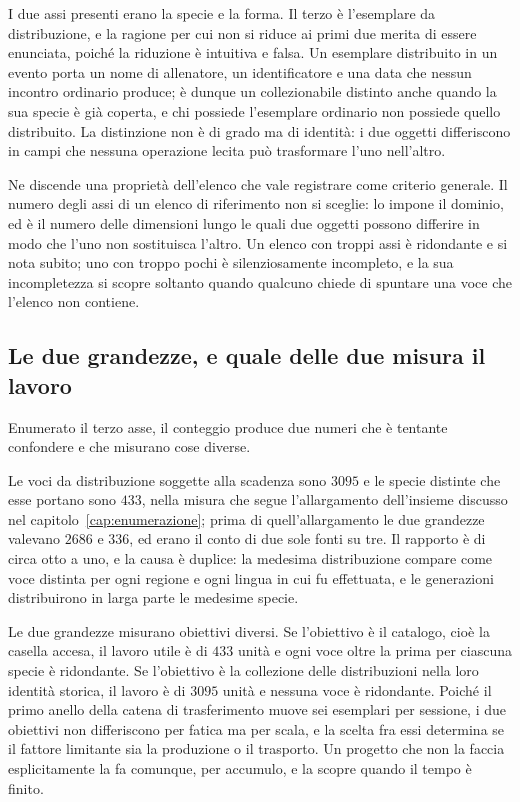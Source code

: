 I due assi presenti erano la specie e la forma. Il terzo è l'esemplare da distribuzione, e la ragione per cui non si riduce ai primi due merita di essere enunciata, poiché la riduzione è intuitiva e falsa. Un esemplare distribuito in un evento porta un nome di allenatore, un identificatore e una data che nessun incontro ordinario produce; è dunque un collezionabile distinto anche quando la sua specie è già coperta, e chi possiede l'esemplare ordinario non possiede quello distribuito. La distinzione non è di grado ma di identità: i due oggetti differiscono in campi che nessuna operazione lecita può trasformare l'uno nell'altro.

Ne discende una proprietà dell'elenco che vale registrare come criterio generale. Il numero degli assi di un elenco di riferimento non si sceglie: lo impone il dominio, ed è il numero delle dimensioni lungo le quali due oggetti possono differire in modo che l'uno non sostituisca l'altro. Un elenco con troppi assi è ridondante e si nota subito; uno con troppo pochi è silenziosamente incompleto, e la sua incompletezza si scopre soltanto quando qualcuno chiede di spuntare una voce che l'elenco non contiene.

\subsection*{Le due grandezze, e quale delle due misura il lavoro}

Enumerato il terzo asse, il conteggio produce due numeri che è tentante confondere e che misurano cose diverse.

Le voci da distribuzione soggette alla scadenza sono $3095$ e le specie distinte che esse portano sono $433$, nella misura che segue l'allargamento dell'insieme discusso nel capitolo~\ref{cap:enumerazione}; prima di quell'allargamento le due grandezze valevano $2686$ e $336$, ed erano il conto di due sole fonti su tre. Il rapporto è di circa otto a uno, e la causa è duplice: la medesima distribuzione compare come voce distinta per ogni regione e ogni lingua in cui fu effettuata, e le generazioni distribuirono in larga parte le medesime specie.

Le due grandezze misurano obiettivi diversi. Se l'obiettivo è il catalogo, cioè la casella accesa, il lavoro utile è di $433$ unità e ogni voce oltre la prima per ciascuna specie è ridondante. Se l'obiettivo è la collezione delle distribuzioni nella loro identità storica, il lavoro è di $3095$ unità e nessuna voce è ridondante. Poiché il primo anello della catena di trasferimento muove sei esemplari per sessione, i due obiettivi non differiscono per fatica ma per scala, e la scelta fra essi determina se il fattore limitante sia la produzione o il trasporto. Un progetto che non la faccia esplicitamente la fa comunque, per accumulo, e la scopre quando il tempo è finito.

